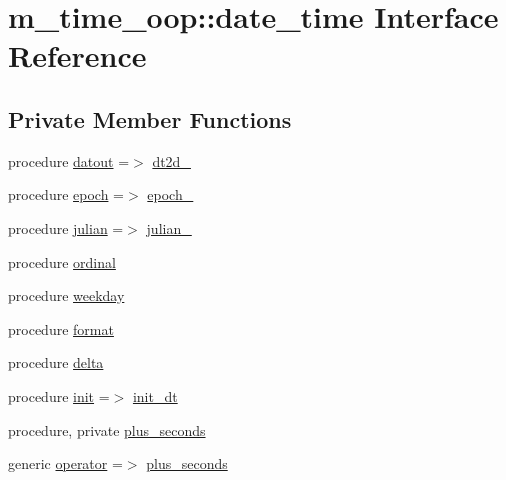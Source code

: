 \hypertarget{structm__time__oop_1_1date__time}{}\section{m\+\_\+time\+\_\+oop\+:\+:date\+\_\+time Interface Reference}
\label{structm__time__oop_1_1date__time}
\subsection*{Private Member Functions}
\begin{DoxyCompactItemize}
\item 
procedure \mbox{\hyperlink{structm__time__oop_1_1date__time_a67bacacb7e3d87a100e5f013a6a92f6b}{datout}} =$>$ \mbox{\hyperlink{namespacem__time__oop_a93bafde872994fe68136d83195400e11}{dt2d\+\_\+}}
\item 
procedure \mbox{\hyperlink{structm__time__oop_1_1date__time_a090bcc7ca5b66296a63917c4ed6524c1}{epoch}} =$>$ \mbox{\hyperlink{namespacem__time__oop_ab4cc90bb587c2d3c2819bffc8f92cb59}{epoch\+\_\+}}
\item 
procedure \mbox{\hyperlink{structm__time__oop_1_1date__time_a3ead9166ebc7ef39fb37a8468849763f}{julian}} =$>$ \mbox{\hyperlink{namespacem__time__oop_a85c4d4edaa644bf22f68ffd724de036a}{julian\+\_\+}}
\item 
procedure \mbox{\hyperlink{structm__time__oop_1_1date__time_aa096a6bd2457e5a9370f89e5e067dc27}{ordinal}}
\item 
procedure \mbox{\hyperlink{structm__time__oop_1_1date__time_a921079cbc082ff2705cebdf330df3270}{weekday}}
\item 
procedure \mbox{\hyperlink{structm__time__oop_1_1date__time_a72439bf18aad8469effe0271bc9c64c9}{format}}
\item 
procedure \mbox{\hyperlink{structm__time__oop_1_1date__time_abb4e1f51226cf6adc9c1b4de56144b99}{delta}}
\item 
procedure \mbox{\hyperlink{structm__time__oop_1_1date__time_ad53d814cb29600d3bf038415dad3d316}{init}} =$>$ \mbox{\hyperlink{namespacem__time__oop_ac81ff1eb27f637a60530d3c5d442fc71}{init\+\_\+dt}}
\item 
procedure, private \mbox{\hyperlink{structm__time__oop_1_1date__time_a86c3ebbfa03eaab62d536e6d01ad67dd}{plus\+\_\+seconds}}
\item 
generic \mbox{\hyperlink{structm__time__oop_1_1date__time_adee559f2f476e1167eb7846a582154ae}{operator}} =$>$ \mbox{\hyperlink{structm__time__oop_1_1date__time_a86c3ebbfa03eaab62d536e6d01ad67dd}{plus\+\_\+seconds}}

\end{DoxyCompactItemize}
